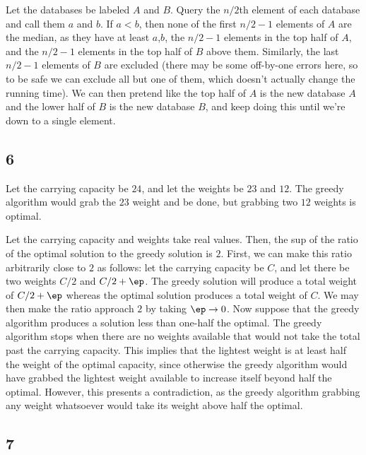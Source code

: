 \documentclass{article}
\begin{document}
Let the databases be labeled $A$ and $B$. Query the $n/2$th element of each database and call them $a$ and $b$. If $a<b$, then none of the first $n/2-1$ elements of $A$ are the median, as they have at least $a$,$b$, the $n/2-1$ elements in the top half of $A$, and the $n/2-1$ elements in the top half of $B$ above them. Similarly, the last $n/2-1$ elements of $B$ are excluded (there may be some off-by-one errors here, so to be safe we can exclude all but one of them, which doesn't actually change the running time). We can then pretend like the top half of $A$ is the new database $A$ and the lower half of $B$ is the new database $B$, and keep doing this until we're down to a single element.
\subsection*{6}
Let the carrying capacity be $24$, and let the weights be $23$ and $12$. The greedy algorithm would grab the $23$ weight and be done, but grabbing two $12$ weights is optimal. 

Let the carrying capacity and weights take real values. Then, the sup of the ratio of the optimal solution to the greedy solution is $2$. First, we can make this ratio arbitrarily close to $2$ as follows: let the carrying capacity be $C$, and let there be two weights $C/2$ and $C/2+\ep$. The greedy solution will produce a total weight of $C/2+\ep$ whereas the optimal solution produces a total weight of $C$. We may then make the ratio approach $2$ by taking $\ep\to0$. Now suppose that the greedy algorithm produces a solution less than one-half the optimal. The greedy algorithm stops when there are no weights available that would not take the total past the carrying capacity. This implies that the lightest weight is at least half the weight of the optimal capacity, since otherwise the greedy algorithm would have grabbed the lightest weight available to increase itself beyond half the optimal. However, this presents a contradiction, as the greedy algorithm grabbing any weight whatsoever would take its weight above half the optimal.
\subsection*{7}
\end{document}
